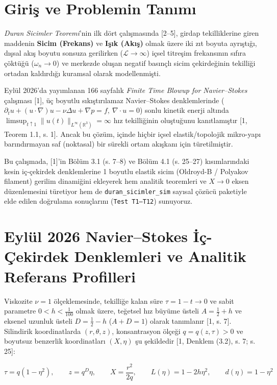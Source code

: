 \documentclass[12pt,a4paper]{article}
\begin{document}
\section{Giriş ve Problemin Tanımı}

\textit{Duran Sicimler Teoremi}'nin ilk dört çalışmasında [2--5], girdap tekilliklerine giren maddenin \textbf{Sicim (Frekans)} ve \textbf{Işık (Akış)} olmak üzere iki zıt boyuta ayrıştığı, dışsal akış boyutu sonsuza gerilirken ($\mathcal{L} \to \infty$) içsel titreşim frekansının sıfıra çöktüğü ($\omega_n \to 0$) ve merkezde oluşan negatif basınçlı sicim çekirdeğinin tekilliği ortadan kaldırdığı kuramsal olarak modellenmişti.

Eylül 2026'da yayımlanan 166 sayfalık \textit{Finite Time Blowup for Navier--Stokes} çalışması [1], üç boyutlu sıkıştırılamaz Navier--Stokes denklemlerinde ($\partial_t u + (u \cdot \nabla)u - \nu \Delta u + \nabla p = f, \ \nabla \cdot u = 0$) sonlu kinetik enerji altında $\limsup_{t \uparrow 1} \|u(t)\|_{L^\infty(\mathbb{R}^3)} = \infty$ hız tekilliğinin oluştuğunu kanıtlamıştır [1, Teorem 1.1, s. 1]. Ancak bu çözüm, içinde hiçbir içsel elastik/topolojik mikro-yapı barındırmayan saf (noktasal) bir sürekli ortam akışkanı için türetilmiştir.

Bu çalışmada, [1]'in Bölüm 3.1 (s. 7--8) ve Bölüm 4.1 (s. 25--27) kısımlarındaki kesin iç-çekirdek denklemlerine 1 boyutlu elastik sicim (Oldroyd-B / Polyakov filament) gerilim dinamiğini ekleyerek hem analitik teoremleri ve $X \to 0$ eksen düzenlemesini türetiyor hem de \texttt{duran\_sicimler\_sim} sayısal çözücü paketiyle elde edilen doğrulama sonuçlarını (\texttt{Test T1--T12}) sunuyoruz.

\section{Eylül 2026 Navier--Stokes İç-Çekirdek Denklemleri ve Analitik Referans Profilleri}

Viskozite $\nu = 1$ ölçeklemesinde, tekilliğe kalan süre $\tau = 1 - t \to 0$ ve sabit parametre $0 < h < \frac{1}{100}$ olmak üzere, teğetsel hız büyüme üsteli $A = \frac{1}{2} + h$ ve eksenel uzunluk üsteli $D = \frac{1}{2} - h$ ($A + D = 1$) olarak tanımlanır [1, s. 7]. Silindirik koordinatlarda $(r, \theta, z)$, konsantrasyon ölçeği $q = q(z, \tau) > 0$ ve boyutsuz benzerlik koordinatları $(X, \eta)$ şu şekildedir [1, Denklem (3.2), s. 7; s. 25]:

\begin{equation}
\tau = q(1 - \eta^2), \qquad z = q^D \eta, \qquad X = \frac{r^2}{2q}, \qquad L(\eta) = 1 - 2h\eta^2, \qquad d(\eta) = 1 - \eta^2
\end{equation}
\end{document}

